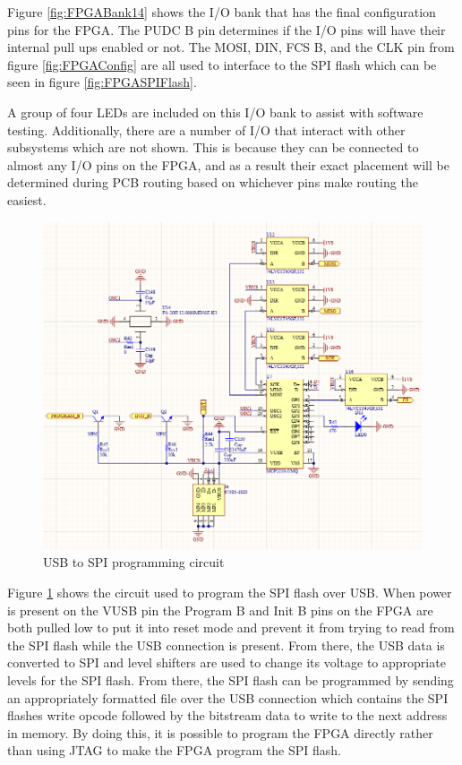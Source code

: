 \documentclass[crop=false]{standalone}
\begin{document}
        Figure \ref{fig:FPGABank14} shows the I/O bank that has the final configuration pins for the FPGA. The PUDC B pin determines if the I/O pins will have their internal pull ups enabled or not. The MOSI, DIN, FCS B, and the CLK pin from figure \ref{fig:FPGAConfig} are all used to interface to the SPI flash which can be seen in figure \ref{fig:FPGASPIFlash}.
            
        A group of four LEDs are included on this I/O bank to assist with software testing. Additionally, there are a number of I/O that interact with other subsystems which are not shown. This is because they can be connected to almost any I/O pins on the FPGA, and as a result their exact placement will be determined during PCB routing based on whichever pins make routing the easiest.
            
        \begin{figure}[H]
            \centering
            \includegraphics[width=\textwidth]{FPGAUSBSPI.PNG}
            \caption{USB to SPI programming circuit}
            \label{fig:FPGAUSBSPI}
        \end{figure}
           
        Figure \ref{fig:FPGAUSBSPI} shows the circuit used to program the SPI flash over USB. When power is present on the VUSB pin the Program B and Init B pins on the FPGA are both pulled low to put it into reset mode and prevent it from trying to read from the SPI flash while the USB connection is present. From there, the USB data is converted to SPI and level shifters are used to change its voltage to appropriate levels for the SPI flash. From there, the SPI flash can be programmed by sending an appropriately formatted file over the USB connection which contains the SPI flashes write opcode followed by the bitstream data to write to the next address in memory. By doing this, it is possible to program the FPGA directly rather than using JTAG to make the FPGA program the SPI flash.
           
\end{document}
